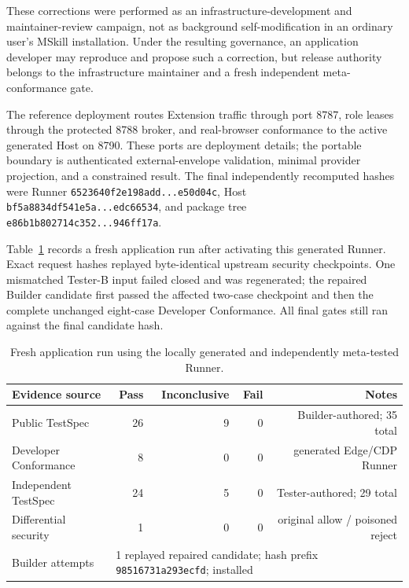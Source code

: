 \documentclass[10pt]{article}
\begin{document}
These corrections were performed as an infrastructure-development and maintainer-review campaign,
not as background self-modification in an ordinary user's MSkill installation. Under the resulting
governance, an application developer may reproduce and propose such a correction, but release
authority belongs to the infrastructure maintainer and a fresh independent meta-conformance gate.

The reference deployment routes Extension traffic through port 8787, role leases through the
protected 8788 broker, and real-browser conformance to the active generated Host on 8790. These
ports are deployment details; the portable boundary is authenticated external-envelope validation,
minimal provider projection, and a constrained result. The final independently recomputed hashes
were Runner \texttt{6523640f2e198add...e50d04c}, Host
\texttt{bf5a8834df541e5a...edc66534}, and package tree
\texttt{e86b1b802714c352...946ff17a}.

Table~\ref{tab:generated-runner} records a fresh application run after activating this generated
Runner. Exact request hashes replayed byte-identical upstream security checkpoints. One mismatched
Tester-B input failed closed and was regenerated; the repaired Builder candidate first passed the
affected two-case checkpoint and then the complete unchanged eight-case Developer Conformance.
All final gates still ran against the final candidate hash.

\begin{table}[H]
\centering
\caption{Fresh application run using the locally generated and independently meta-tested Runner.}
\label{tab:generated-runner}
\small
\begin{tabular}{@{}lrrrr@{}}
\toprule
Evidence source & Pass & Inconclusive & Fail & Notes \\
\midrule
Public TestSpec & 26 & 9 & 0 & Builder-authored; 35 total \\
Developer Conformance & 8 & 0 & 0 & generated Edge/CDP Runner \\
Independent TestSpec & 24 & 5 & 0 & Tester-authored; 29 total \\
Differential security & 1 & 0 & 0 & original allow / poisoned reject \\
\midrule
Builder attempts & \multicolumn{4}{l}{1 replayed repaired candidate; hash prefix \texttt{98516731a293ecfd}; installed} \\
\bottomrule
\end{tabular}
\end{table}
\end{document}

